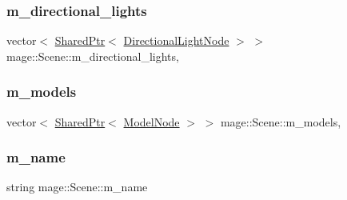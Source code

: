 \hypertarget{classmage_1_1_scene_a895f2ae809c17be09072f6bb89fd4e9c}{}\label{classmage_1_1_scene_a895f2ae809c17be09072f6bb89fd4e9c} 
\subsubsection{\texorpdfstring{m\+\_\+directional\+\_\+lights}{m\_directional\_lights}}
{\footnotesize\ttfamily vector$<$ \hyperlink{namespacemage_a1e01ae66713838a7a67d30e44c67703e}{Shared\+Ptr}$<$ \hyperlink{namespacemage_a7637b5351fc0f66a10badd80ebb35899}{Directional\+Light\+Node} $>$ $>$ mage\+::\+Scene\+::m\+\_\+directional\+\_\+lights\hspace{0.3cm}{\ttfamily [mutable]}, {\ttfamily [private]}}

\hypertarget{classmage_1_1_scene_a01132a667fbc1517f11ae561bc221071}{}\label{classmage_1_1_scene_a01132a667fbc1517f11ae561bc221071} 
\subsubsection{\texorpdfstring{m\+\_\+models}{m\_models}}
{\footnotesize\ttfamily vector$<$ \hyperlink{namespacemage_a1e01ae66713838a7a67d30e44c67703e}{Shared\+Ptr}$<$ \hyperlink{classmage_1_1_model_node}{Model\+Node} $>$ $>$ mage\+::\+Scene\+::m\+\_\+models\hspace{0.3cm}{\ttfamily [mutable]}, {\ttfamily [private]}}

\hypertarget{classmage_1_1_scene_a6cc8cb08b1853c4e3063b33a94e8fb47}{}\label{classmage_1_1_scene_a6cc8cb08b1853c4e3063b33a94e8fb47} 
\subsubsection{\texorpdfstring{m\+\_\+name}{m\_name}}
{\footnotesize\ttfamily string mage\+::\+Scene\+::m\+\_\+name\hspace{0.3cm}{\ttfamily [private]}}

\hypertarget{classmage_1_1_scene_a881c3dd7e85e5069650f29fd2722bf78}{}\label{classmage_1_1_scene_a881c3dd7e85e5069650f29fd2722bf78} 
